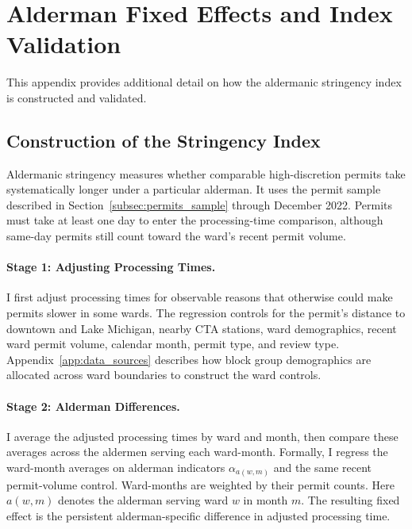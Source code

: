 
\section{Alderman Fixed Effects and Index Validation}
\label{sec:appendix_alderman_fe}

This appendix provides additional detail on how the aldermanic stringency index is constructed and validated.

\subsection{Construction of the Stringency Index}
\label{subsec:stringency_index_construction}

Aldermanic stringency measures whether comparable high-discretion permits take systematically longer under a particular alderman.
It uses the permit sample described in Section~\ref{subsec:permits_sample} through December 2022.
Permits must take at least one day to enter the processing-time comparison, although same-day permits still count toward the ward's recent permit volume.

\paragraph{Stage 1: Adjusting Processing Times.}
I first adjust processing times for observable reasons that otherwise could make permits slower in some wards.
The regression controls for the permit's distance to downtown and Lake Michigan, nearby CTA stations, ward demographics, recent ward permit volume, calendar month, permit type, and review type.
Appendix~\ref{app:data_sources} describes how block group demographics are allocated across ward boundaries to construct the ward controls.

\paragraph{Stage 2: Alderman Differences.}
I average the adjusted processing times by ward and month, then compare these averages across the aldermen serving each ward-month.
Formally, I regress the ward-month averages on alderman indicators $\alpha_{a(w,m)}$ and the same recent permit-volume control.
Ward-months are weighted by their permit counts.
Here $a(w,m)$ denotes the alderman serving ward $w$ in month $m$.
The resulting fixed effect is the persistent alderman-specific difference in adjusted processing time.

